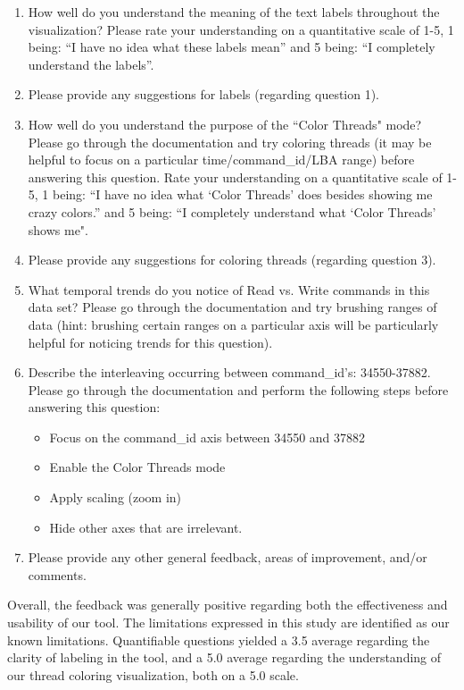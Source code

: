 \documentclass[journal]{vgtc}                %
\begin{document}
\begin{enumerate}
\item How well do you understand the meaning of the text labels throughout the visualization? Please rate your understanding on a quantitative scale of 1-5, 1 being: ``I have no idea what these labels mean'' and 5 being: ``I completely understand the labels''.

\item Please provide any suggestions for labels (regarding question 1).

\item How well do you understand the purpose of the ``Color Threads" mode? Please go through the documentation and try coloring threads (it may be helpful to focus on a particular time/command\_id/LBA range) before answering this question. Rate your understanding on a quantitative scale of 1-5, 1 being: ``I have no idea what `Color Threads' does besides showing me crazy colors.'' and 5 being: ``I completely understand what `Color Threads' shows me".

\item Please provide any suggestions for coloring threads (regarding question 3).

\item What temporal trends do you notice of Read vs. Write commands in this data set? Please go through the documentation and try brushing ranges of data (hint: brushing certain ranges on a particular axis will be particularly helpful for noticing trends for this question).

\item Describe the interleaving occurring between command\_id's: 34550-37882. Please go through the documentation and perform the following steps before answering this question: 
\begin{itemize}
\item Focus on the command\_id axis between 34550 and 37882 
\item Enable the Color Threads mode 
\item Apply scaling (zoom in)
\item Hide other axes that are irrelevant.
\end{itemize}

\item Please provide any other general feedback, areas of improvement, and/or comments.

\end{enumerate}

Overall, the feedback was generally positive regarding both the effectiveness and usability of our tool. The limitations expressed in this study are identified as our known limitations. Quantifiable questions yielded a 3.5 average regarding the clarity of labeling in the tool, and a 5.0 average regarding the understanding of our thread coloring visualization, both on a 5.0 scale. 
\end{document}
